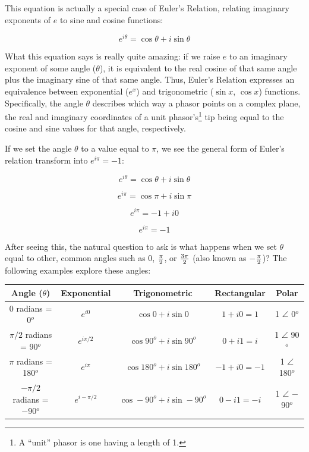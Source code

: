 This equation is actually a special case of Euler's Relation, relating imaginary exponents of $e$ to sine and cosine functions:

$$e^{i\theta} = \cos \theta + i \sin \theta$$

What this equation says is really quite amazing: if we raise $e$ to an imaginary exponent of some angle ($\theta$), it is equivalent to the real cosine of that same angle plus the imaginary sine of that same angle.  Thus, Euler's Relation expresses an equivalence between exponential ($e^x$) and trigonometric ($\sin x$, $\cos x$) functions.  Specifically, the angle $\theta$ describes which way a phasor points on a complex plane, the real and imaginary coordinates of a unit phasor's\footnote{A ``unit'' phasor is one having a length of 1.} tip being equal to the cosine and sine values for that angle, respectively.

If we set the angle $\theta$ to a value equal to $\pi$, we see the general form of Euler's relation transform into $e^{i \pi} = -1$: 

$$e^{i\theta} = \cos \theta + i \sin \theta$$

$$e^{i\pi} = \cos \pi + i \sin \pi$$

$$e^{i\pi} = -1 + i0$$

$$e^{i\pi} = -1$$

\filbreak

After seeing this, the natural question to ask is what happens when we set $\theta$ equal to other, common angles such as 0, $\pi \over 2$, or $3\pi \over 2$ (also known as $-{\pi \over 2}$)?  The following examples explore these angles:

\begin{center}
\begin{tabular}{| c | c | c | c | c |}
\hline 
\textbf{Angle} ($\theta$) & \textbf{Exponential} & \textbf{Trigonometric} & \textbf{Rectangular} & \textbf{Polar} \\[3pt] \hline
0 radians = 0$^{o}$ & $e^{i0}$ & $\cos 0 + i \sin 0$ & $1 + i0 = 1$ & 1 $\angle$ 0$^{o}$ \\[3pt] \hline 
$\pi / 2$ radians = 90$^{o}$ & $e^{i \pi / 2}$ & $\cos 90^{o} + i \sin 90^{o}$ & $0 + i1 = i$ & 1 $\angle$ 90$^{o}$\\[3pt] \hline 
$\pi$ radians = 180$^{o}$ & $e^{i \pi}$ & $\cos 180^{o} + i \sin 180^{o}$ & $-1 + i0 = -1$ & 1 $\angle$ 180$^{o}$\\[3pt] \hline 
$-\pi / 2$ radians = $-$90$^{o}$ & $e^{i -\pi / 2}$ & $\cos -90^{o} + i \sin -90^{o}$ & $0 - i1 = -i$ & 1 $\angle$ $-$90$^{o}$ \\[3pt] \hline 
\end{tabular}
\end{center}

